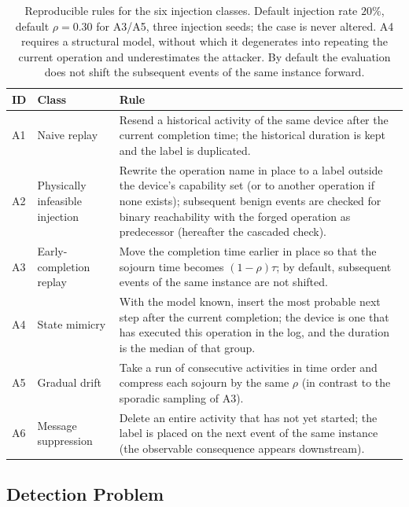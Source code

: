 \documentclass[manuscript,screen,review]{acmart}
\begin{document}
\begin{table}[!t]
\renewcommand{\arraystretch}{1.12}
\caption{Reproducible rules for the six injection classes. Default injection rate $20\%$, default $\rho=0.30$ for {A3}/{A5}, three injection seeds; the case is never altered. {A4} requires a structural model, without which it degenerates into repeating the current operation and underestimates the attacker. By default the evaluation does not shift the subsequent events of the same instance forward.}
\label{tab:inject}
\centering
\small
\begin{tabular}{lL{2.6cm}L{6.6cm}}
\toprule
ID & Class & Rule \\
\midrule
{A1} & Naive replay & Resend a historical activity of the same device after the current completion time; the historical duration is kept and the label is duplicated. \\
{A2} & Physically infeasible injection & Rewrite the operation name in place to a label outside the device's capability set (or to another operation if none exists); subsequent benign events are checked for binary reachability with the forged operation as predecessor (hereafter the cascaded check). \\
{A3} & Early-completion replay & Move the completion time earlier in place so that the sojourn time becomes $(1-\rho)\tau$; by default, subsequent events of the same instance are not shifted. \\
{A4} & State mimicry & With the model known, insert the most probable next step after the current completion; the device is one that has executed this operation in the log, and the duration is the median of that group. \\
{A5} & Gradual drift & Take a run of consecutive activities in time order and compress each sojourn by the same $\rho$ (in contrast to the sporadic sampling of {A3}). \\
{A6} & Message suppression & Delete an entire activity that has not yet started; the label is placed on the next event of the same instance (the observable consequence appears downstream). \\
\bottomrule
\end{tabular}
\end{table}

\subsection{Detection Problem}
\label{sec:detproblem}
\end{document}
